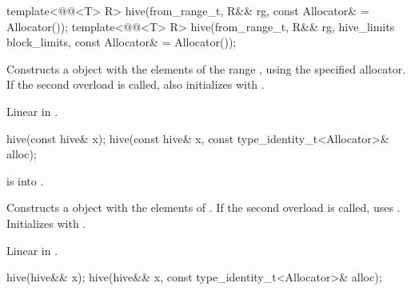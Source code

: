 %
\begin{itemdecl}
template<@@<T> R>
  hive(from_range_t, R&& rg, const Allocator& = Allocator());
template<@@<T> R>
  hive(from_range_t, R&& rg, hive_limits block_limits, const Allocator& = Allocator());
\end{itemdecl}

\begin{itemdescr}
\pnum
\effects
Constructs a  object with the elements of the range ,
using the specified allocator.
If the second overload is called,
also initializes  with .

\pnum
\complexity
Linear in .
\end{itemdescr}

%
\begin{itemdecl}
hive(const hive& x);
hive(const hive& x, const type_identity_t<Allocator>& alloc);
\end{itemdecl}

\begin{itemdescr}
\pnum
\expects
{} is  into .

\pnum
\effects
Constructs a  object with the elements of .
If the second overload is called, uses .
Initializes  with .

\pnum
\complexity
Linear in .
\end{itemdescr}

%
\begin{itemdecl}
hive(hive&& x);
hive(hive&& x, const type_identity_t<Allocator>& alloc);
\end{itemdecl}

